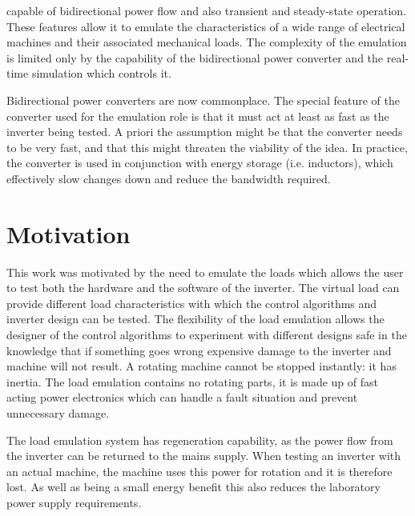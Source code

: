 capable of bidirectional power flow and also transient and steady-state operation. These features allow it to emulate the characteristics of a wide range of electrical machines and their associated mechanical loads. The complexity of the emulation is limited only by the
capability of the bidirectional power converter and the real-time simulation which controls it.\par
Bidirectional power converters are now commonplace. The special feature of the converter used for the emulation role is that it must act at least as fast as the inverter being tested. A priori the assumption might be that the converter needs to be very fast, and that this
might threaten the viability of the idea. In practice, the converter is used in conjunction with energy storage (i.e. inductors), which effectively slow changes down and reduce the bandwidth required.\par
\section{Motivation}
This work was motivated by the need to emulate the loads which allows the user to test both the hardware and the software of the inverter. The virtual load can provide different load characteristics with which the control algorithms and inverter design can be
tested. The flexibility of the load emulation allows the designer of the control algorithms to experiment with different designs safe in the knowledge that if something goes wrong expensive damage to the inverter and machine will not result. A rotating machine cannot be stopped instantly: it has inertia. The load emulation contains no rotating parts, it is made up of fast acting power electronics which can handle a fault situation and prevent unnecessary damage.\par
The load emulation system has regeneration capability, as the power flow from the inverter can be returned to the mains supply. When testing an inverter with an actual machine, the machine uses this power for rotation and it is therefore lost. As well as being a small energy benefit this also reduces the laboratory power supply requirements.
